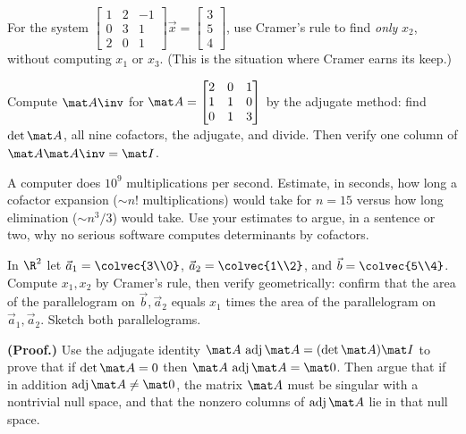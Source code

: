 \begin{exercise}\label{ch22:ex-cramer-one}
For the system $\begin{bmatrix} 1 & 2 & -1 \\ 0 & 3 & 1 \\ 2 & 0 & 1\end{bmatrix}\vec
x=\begin{bmatrix} 3 \\ 5 \\ 4\end{bmatrix}$, use Cramer's rule to find \emph{only} $x_2$, without
computing $x_1$ or $x_3$. (This is the situation where Cramer earns its keep.)
\end{exercise}

\begin{exercise}\label{ch22:ex-adj3x3}
Compute $\mat A\inv$ for $\mat A=\begin{bmatrix} 2 & 0 & 1 \\ 1 & 1 & 0 \\ 0 & 1 & 3\end{bmatrix}$ by
the adjugate method: find $\det\mat A$, all nine cofactors, the adjugate, and divide. Then verify one
column of $\mat A\mat A\inv=\mat I$.
\end{exercise}

\begin{exercise}\label{ch22:ex-cost}
A computer does $10^9$ multiplications per second. Estimate, in seconds, how long a cofactor expansion
($\sim n!$ multiplications) would take for $n=15$ versus how long elimination ($\sim n^3/3$) would
take. Use your estimates to argue, in a sentence or two, why no serious software computes determinants
by cofactors.
\end{exercise}

\begin{exercise}\label{ch22:ex-geom-cramer}
In $\R^2$ let $\vec a_1=\colvec{3\\0}$, $\vec a_2=\colvec{1\\2}$, and $\vec b=\colvec{5\\4}$. Compute
$x_1,x_2$ by Cramer's rule, then verify geometrically: confirm that the area of the parallelogram on
$\vec b,\vec a_2$ equals $x_1$ times the area of the parallelogram on $\vec a_1,\vec a_2$. Sketch both
parallelograms.
\end{exercise}

\begin{exercise}\label{ch22:ex-proof-singular}
\textbf{(Proof.)} Use the adjugate identity $\mat A\,\operatorname{adj}\mat A=(\det\mat A)\mat I$ to
prove that if $\det\mat A=0$ then $\mat A\,\operatorname{adj}\mat A=\mat 0$. Then argue that if in
addition $\operatorname{adj}\mat A\neq\mat 0$, the matrix $\mat A$ must be singular with a nontrivial
null space, and that the nonzero columns of $\operatorname{adj}\mat A$ lie in that null space.
\end{exercise}

